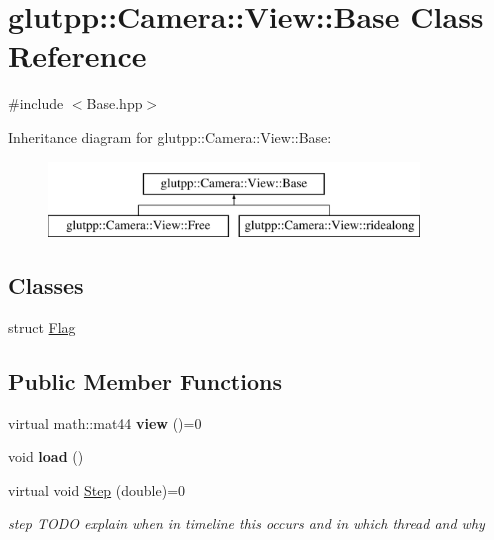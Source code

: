 \hypertarget{classglutpp_1_1Camera_1_1View_1_1Base}{\section{glutpp\-:\-:\-Camera\-:\-:\-View\-:\-:\-Base \-Class \-Reference}
\label{classglutpp_1_1Camera_1_1View_1_1Base}
}


 




{\ttfamily \#include $<$\-Base.\-hpp$>$}

\-Inheritance diagram for glutpp\-:\-:\-Camera\-:\-:\-View\-:\-:\-Base\-:\begin{figure}[H]
\begin{center}
\leavevmode
\includegraphics[height=2.000000cm]{classglutpp_1_1Camera_1_1View_1_1Base}
\end{center}
\end{figure}
\subsection*{\-Classes}
\begin{DoxyCompactItemize}
\item 
struct \hyperlink{structglutpp_1_1Camera_1_1View_1_1Base_1_1Flag}{\-Flag}
\end{DoxyCompactItemize}
\subsection*{\-Public \-Member \-Functions}
\begin{DoxyCompactItemize}
\item 
\hypertarget{classglutpp_1_1Camera_1_1View_1_1Base_ae4f66f3d8976c8a611132f52ffd8a33a}{virtual math\-::mat44 {\bfseries view} ()=0}\label{classglutpp_1_1Camera_1_1View_1_1Base_ae4f66f3d8976c8a611132f52ffd8a33a}

\item 
\hypertarget{classglutpp_1_1Camera_1_1View_1_1Base_aa50111a2f1afe732fb01a073b35cc0c0}{void {\bfseries load} ()}\label{classglutpp_1_1Camera_1_1View_1_1Base_aa50111a2f1afe732fb01a073b35cc0c0}

\item 
\hypertarget{classglutpp_1_1Camera_1_1View_1_1Base_ade8b42ca481fca70f89a1cbf357bbbb7}{virtual void \hyperlink{classglutpp_1_1Camera_1_1View_1_1Base_ade8b42ca481fca70f89a1cbf357bbbb7}{\-Step} (double)=0}\label{classglutpp_1_1Camera_1_1View_1_1Base_ade8b42ca481fca70f89a1cbf357bbbb7}

\begin{DoxyCompactList}\small\item\em step \-T\-O\-D\-O explain when in timeline this occurs and in which thread and why \end{DoxyCompactList}\end{DoxyCompactItemize}
